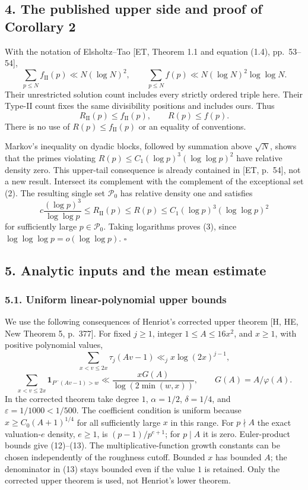\documentclass[
  english,
  11pt,
]{article}
\begin{document}
\subsection{4. The published upper side and proof of Corollary
2}\label{the-published-upper-side-and-proof-of-corollary-2}

With the notation of Elsholtz--Tao {[}ET, Theorem 1.1 and equation
(1.4), pp.~53--54{]}, \[
\sum_{p\le N}f_{\mathrm{II}}(p)\ll N(\log N)^2,\qquad
\sum_{p\le N}f(p)\ll N(\log N)^2\log\log N. \tag{11}
\] Their unrestricted solution count includes every strictly ordered
triple here. Their Type-II count fixes the same divisibility positions
and includes ours. Thus \[
R_{\mathrm{II}}(p)\le f_{\mathrm{II}}(p),\qquad R(p)\le f(p).
\] There is no use of \(R(p)\le f_{\mathrm{II}}(p)\) or an equality of
conventions.

Markov's inequality on dyadic blocks, followed by summation above
\(\sqrt N\), shows that the primes violating
\(R(p)\le C_1(\log p)^3(\log\log p)^2\) have relative density zero. This
upper-tail consequence is already contained in {[}ET, p.~54{]}, not a
new result. Intersect its complement with the complement of the
exceptional set (2). The resulting single set \(\mathcal P_0\) has
relative density one and satisfies \[
c\frac{(\log p)^3}{\log\log p}
\le R_{\mathrm{II}}(p)\le R(p)
\le C_1(\log p)^3(\log\log p)^2
\] for sufficiently large \(p\in\mathcal P_0\). Taking logarithms proves
(3), since \(\log\log\log p=o(\log\log p)\). \(\square\)

\subsection{5. Analytic inputs and the mean
estimate}\label{analytic-inputs-and-the-mean-estimate}

\subsubsection{5.1. Uniform linear-polynomial upper
bounds}\label{uniform-linear-polynomial-upper-bounds}

We use the following consequences of Henriot's corrected upper theorem
{[}H, HE, New Theorem 5, p.~377{]}. For fixed \(j\ge1\), integer
\(1\le A\le16x^2\), and \(x\ge1\), with positive polynomial values, \[
\sum_{x<v\le2x}\tau_j(Av-1)\ll_j x\log(2x)^{j-1}, \tag{12}
\] \[
\sum_{x<v\le2x}\mathbf1_{P^-(Av-1)>w}
\ll\frac{xG(A)}{\log(2\min(w,x))},\qquad G(A)=A/\varphi(A). \tag{13}
\] In the corrected theorem take degree \(1\), \(\alpha=1/2\),
\(\delta=1/4\), and \(\varepsilon=1/1000<1/500\). The coefficient
condition is uniform because \(x\ge C_0(A+1)^{1/4}\) for all
sufficiently large \(x\) in this range. For \(p\nmid A\) the exact
valuation-\(e\) density, \(e\ge1\), is \((p-1)/p^{e+1}\); for
\(p\mid A\) it is zero. Euler-product bounds give (12)--(13). The
multiplicative-function growth constants can be chosen independently of
the roughness cutoff. Bounded \(x\) has bounded \(A\); the denominator
in (13) stays bounded even if the value \(1\) is retained. Only the
corrected upper theorem is used, not Henriot's lower theorem.
\end{document}
